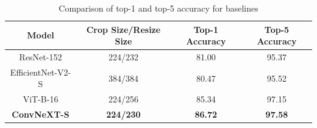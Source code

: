 \documentclass{article}
\begin{document}
\begin{table}[h]
  \centering
  \renewcommand{\arraystretch}{1.25}
  \begin{tabular}{cccc}
    \hline
    \textbf{Model} & \textbf{Crop Size/Resize Size} & \textbf{Top-1 Accuracy} & \textbf{Top-5 Accuracy} \\
    \hline
    ResNet-152 & 224/232 & 81.00 & 95.37 \\
    EfficientNet-V2-S & 384/384 & 80.47 & 95.52 \\
    ViT-B-16 & 224/256 & 85.34 & 97.15 \\\hline
    \textbf{ConvNeXT-S} & \textbf{224/230} & \textbf{86.72} & \textbf{97.58} \\\hline
  \end{tabular}
  \caption{Comparison of top-1 and top-5 accuracy for baselines}
  \label{tab:comparison-results}
\end{table}
\end{document}
